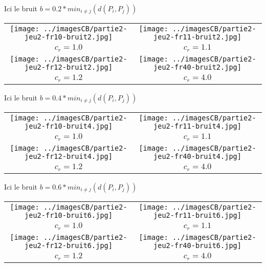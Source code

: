 \documentclass[11pt,a4paper]{article}
\begin{document}
\pagebreak

Ici le bruit $b=0.2*min_{i \neq j}(d(P_i,P_j))$
\begin{center}
\begin{tabular}{|c|c|}
\hline
\texttt{[image: ../imagesCB/partie2-jeu2-fr10-bruit2.jpg]} & \texttt{[image: ../imagesCB/partie2-jeu2-fr11-bruit2.jpg]} \\
$c_r=1.0$                                                             & $c_r=1.1$ \\
\hline
\texttt{[image: ../imagesCB/partie2-jeu2-fr12-bruit2.jpg]} & \texttt{[image: ../imagesCB/partie2-jeu2-fr40-bruit2.jpg]} \\
$c_r=1.2$                                                             & $c_r=4.0$ \\
\hline
\end{tabular}
\end{center}

\pagebreak

Ici le bruit $b=0.4*min_{i \neq j}(d(P_i,P_j))$
\begin{center}
\begin{tabular}{|c|c|}
\hline
\texttt{[image: ../imagesCB/partie2-jeu2-fr10-bruit4.jpg]} & \texttt{[image: ../imagesCB/partie2-jeu2-fr11-bruit4.jpg]} \\
$c_r=1.0$                                                             & $c_r=1.1$ \\
\hline
\texttt{[image: ../imagesCB/partie2-jeu2-fr12-bruit4.jpg]} & \texttt{[image: ../imagesCB/partie2-jeu2-fr40-bruit4.jpg]} \\
$c_r=1.2$                                                             & $c_r=4.0$ \\
\hline
\end{tabular}
\end{center}

\pagebreak

Ici le bruit $b=0.6*min_{i \neq j}(d(P_i,P_j))$
\begin{center}
\begin{tabular}{|c|c|}
\hline
\texttt{[image: ../imagesCB/partie2-jeu2-fr10-bruit6.jpg]} & \texttt{[image: ../imagesCB/partie2-jeu2-fr11-bruit6.jpg]} \\
$c_r=1.0$                                                             & $c_r=1.1$ \\
\hline
\texttt{[image: ../imagesCB/partie2-jeu2-fr12-bruit6.jpg]} & \texttt{[image: ../imagesCB/partie2-jeu2-fr40-bruit6.jpg]} \\
$c_r=1.2$                                                             & $c_r=4.0$ \\
\hline
\end{tabular}
\end{center}
\end{document}
